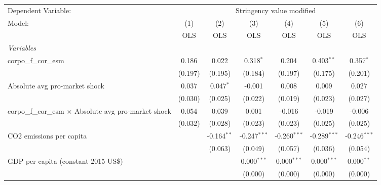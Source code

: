 
\begingroup
\centering
\begin{tabular}{lcccccc}
   \toprule
   Dependent Variable: & \multicolumn{6}{c}{Stringency value modified}\\
   Model:                                                        & (1)     & (2)           & (3)            & (4)            & (5)            & (6)\\  
                                                                 &  OLS    & OLS           & OLS            & OLS            & OLS            & OLS\\  
   \midrule
   \emph{Variables}\\
   corpo\_f\_cor\_esm                                            & 0.186   & 0.022         & 0.318$^{*}$    & 0.204          & 0.403$^{**}$   & 0.357$^{*}$\\   
                                                                 & (0.197) & (0.195)       & (0.184)        & (0.197)        & (0.175)        & (0.201)\\   
   Absolute avg pro-market shock                                 & 0.037   & 0.047$^{*}$   & -0.001         & 0.008          & 0.009          & 0.027\\   
                                                                 & (0.030) & (0.025)       & (0.022)        & (0.019)        & (0.023)        & (0.027)\\   
   corpo\_f\_cor\_esm $\times$ Absolute avg pro-market shock     & 0.054   & 0.039         & 0.001          & -0.016         & -0.019         & -0.006\\   
                                                                 & (0.032) & (0.028)       & (0.023)        & (0.023)        & (0.025)        & (0.025)\\   
   CO2 emissions per capita                                      &         & -0.164$^{**}$ & -0.247$^{***}$ & -0.260$^{***}$ & -0.289$^{***}$ & -0.246$^{***}$\\   
                                                                 &         & (0.063)       & (0.049)        & (0.057)        & (0.036)        & (0.054)\\   
   GDP per capita (constant 2015 US\$)                           &         &               & 0.000$^{***}$  & 0.000$^{***}$  & 0.000$^{***}$  & 0.000$^{**}$\\   
                                                                 &         &               & (0.000)        & (0.000)        & (0.000)        & (0.000)\\   

\end{tabular}
